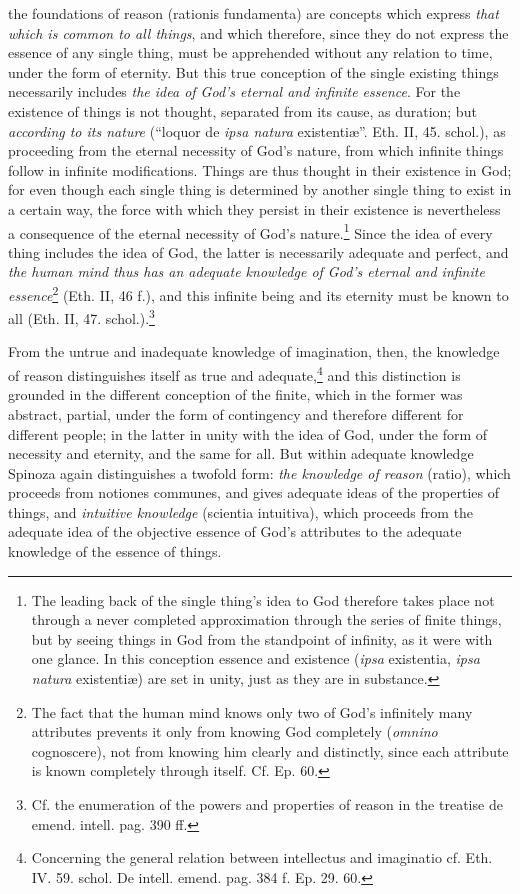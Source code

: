 \documentclass[12pt,a4paper,openany]{book}
\newcommand{\opage}[1]{\marginnote{\footnotesize\textit{[#1]}}}
\begin{document}
the foundations of reason (rationis fundamenta) are concepts which
express \emph{that which is common to all things}, and which therefore, since
they do not express the essence of any single thing, must be apprehended without
any relation to time, under the form of eternity. But this
true conception of the single existing things necessarily
includes \emph{the idea of God's eternal and infinite essence}. For the existence
of things is
\opage{94}\setcounter{footnote}{0}not thought, separated from its cause, as duration; but
\emph{according to its nature} (``loquor de \emph{ipsa natura} existentiæ''. Eth. II,
45. schol.), as proceeding from the eternal
necessity of God's nature, from which infinite things follow in infinite
modifications. Things are thus thought in their existence in
God; for even though each single thing is determined by another single
thing to exist in a certain way, the force
with which they persist in their existence is nevertheless a consequence of the eternal
necessity of God's nature.\footnote{The leading back of the
single thing's idea to God therefore takes place not through a never
completed approximation through the series of finite things, but
by seeing things in God from the standpoint of infinity, as it were with one glance.
In this conception essence and existence
(\emph{ipsa} existentia, \emph{ipsa natura} existentiæ) are set in
unity, just as they are in substance.} Since the idea of every thing
includes the idea of God, the latter is necessarily adequate and
perfect, and \emph{the human mind thus has an
adequate knowledge of God's eternal and infinite
essence}\footnote{The fact that the human mind knows only two
of God's infinitely many attributes prevents it only from
knowing God completely (\emph{omnino} cognoscere), not from
knowing him clearly and distinctly, since each attribute is known
completely through itself. Cf. Ep. 60.} (Eth. II, 46 f.), and this
infinite being and its eternity must be known to all
(Eth. II, 47. schol.).\footnote{Cf. the enumeration of the
powers and properties of reason in the treatise de emend. intell. pag.
390 ff.}

From the untrue and inadequate knowledge of imagination, then,
the knowledge of reason distinguishes itself as true and
adequate,\footnote{Concerning the general relation between
intellectus and imaginatio cf. Eth. IV. 59. schol. De intell.
emend. pag. 384 f. Ep. 29. 60.} and this distinction is
grounded in the different conception of the finite, which in
the former was abstract, partial, under the form of contingency and
therefore different for different people; in the latter in unity with
the idea of God, under the form of necessity and eternity, and the same
for all. But within adequate knowledge
Spinoza again distinguishes a twofold form: \emph{the knowledge of reason}
(ratio), which
\opage{95}\setcounter{footnote}{0}proceeds from notiones communes, and gives adequate ideas of
the properties of things, and \emph{intuitive knowledge}
(scientia intuitiva), which proceeds from the adequate idea of
the objective essence of God's attributes to the adequate knowledge of
the essence of things.
\end{document}
